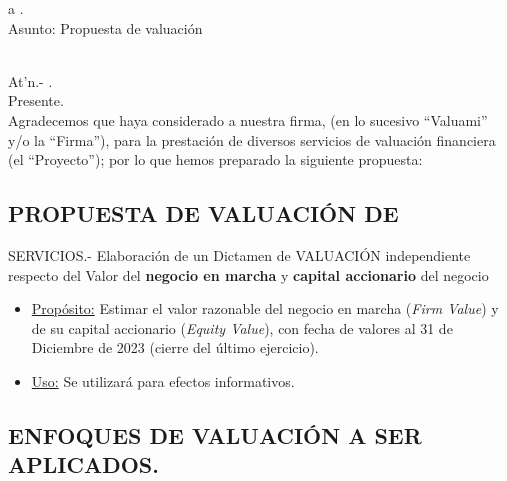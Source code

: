 \documentclass[5pt,letter]{article}
\begin{document}
\begin{flushright}
\lugarCotizacion{} a \fechaCotizacion.\\
\textcolor{principal}{Asunto:} Propuesta de valuación\\
 \empresaSolicitante
\end{flushright}

\textcolor{principal}{\empresaSolicitante}\\

At'n.- \personaSolicitante.\\

Presente.\\

Agradecemos que haya considerado a nuestra firma, (en lo sucesivo ``Valuami''\textregistered{} y/o la ``Firma''), para la prestación de diversos servicios de valuación financiera (el “Proyecto”); por lo que hemos preparado la siguiente propuesta:

\begin{center}
\section{PROPUESTA DE VALUACIÓN DE \empresaSolicitante}
\end{center}

\textcolor{principal}{SERVICIOS.-} Elaboración de un Dictamen de VALUACIÓN independiente respecto del Valor del \textbf{negocio en marcha} y \textbf{capital accionario} del negocio \textcolor{principal}{\empresaSolicitante}\\

 
 \begin{itemize}
 \item \underline{Propósito:} Estimar el valor razonable del negocio en marcha (\textit{Firm Value}) y de su capital accionario (\textit{Equity Value}), con fecha de valores al 31 de Diciembre de 2023 (cierre del último ejercicio).
 
\item \underline{Uso:} Se utilizará para efectos informativos.
 
 \end{itemize}
 
 \begin{center}
 \section{ENFOQUES DE VALUACIÓN A SER APLICADOS.}
 \end{center}
 
\end{document}
